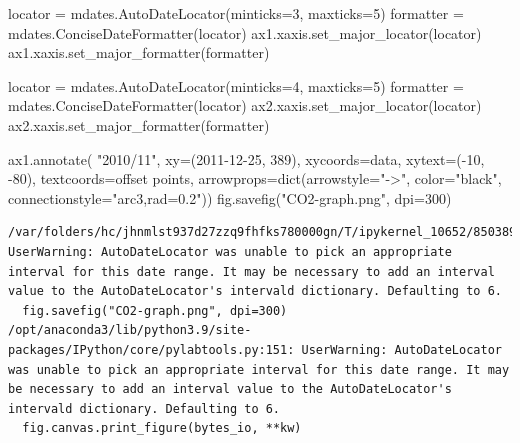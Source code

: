 \documentclass[
  letterpaper,
  DIV=11,
  numbers=noendperiod,
  oneside]{scrreprt}
\newenvironment{Shaded}{\begin{snugshade}}{\end{snugshade}}
\newcommand{\BuiltInTok}[1]{\textcolor[rgb]{0.00,0.23,0.31}{#1}}
\newcommand{\DecValTok}[1]{\textcolor[rgb]{0.68,0.00,0.00}{#1}}
\newcommand{\NormalTok}[1]{\textcolor[rgb]{0.00,0.23,0.31}{#1}}
\newcommand{\OperatorTok}[1]{\textcolor[rgb]{0.37,0.37,0.37}{#1}}
\newcommand{\StringTok}[1]{\textcolor[rgb]{0.13,0.47,0.30}{#1}}
\begin{document}
\begin{Shaded}
\begin{Highlighting}[]
\NormalTok{locator }\OperatorTok{=}\NormalTok{ mdates.AutoDateLocator(minticks}\OperatorTok{=}\DecValTok{3}\NormalTok{, maxticks}\OperatorTok{=}\DecValTok{5}\NormalTok{)}
\NormalTok{formatter }\OperatorTok{=}\NormalTok{ mdates.ConciseDateFormatter(locator)}
\NormalTok{ax1.xaxis.set\_major\_locator(locator)}
\NormalTok{ax1.xaxis.set\_major\_formatter(formatter)}

\NormalTok{locator }\OperatorTok{=}\NormalTok{ mdates.AutoDateLocator(minticks}\OperatorTok{=}\DecValTok{4}\NormalTok{, maxticks}\OperatorTok{=}\DecValTok{5}\NormalTok{)}
\NormalTok{formatter }\OperatorTok{=}\NormalTok{ mdates.ConciseDateFormatter(locator)}
\NormalTok{ax2.xaxis.set\_major\_locator(locator)}
\NormalTok{ax2.xaxis.set\_major\_formatter(formatter)}

\NormalTok{ax1.annotate(}
    \StringTok{"2010/11"}\NormalTok{,}
\NormalTok{    xy}\OperatorTok{=}\NormalTok{(}\StringTok{\textquotesingle{}2011{-}12{-}25\textquotesingle{}}\NormalTok{, }\DecValTok{389}\NormalTok{),  xycoords}\OperatorTok{=}\StringTok{\textquotesingle{}data\textquotesingle{}}\NormalTok{,}
\NormalTok{    xytext}\OperatorTok{=}\NormalTok{(}\OperatorTok{{-}}\DecValTok{10}\NormalTok{, }\OperatorTok{{-}}\DecValTok{80}\NormalTok{), textcoords}\OperatorTok{=}\StringTok{\textquotesingle{}offset points\textquotesingle{}}\NormalTok{,}
\NormalTok{    arrowprops}\OperatorTok{=}\BuiltInTok{dict}\NormalTok{(arrowstyle}\OperatorTok{=}\StringTok{"{-}\textgreater{}"}\NormalTok{,}
\NormalTok{                    color}\OperatorTok{=}\StringTok{"black"}\NormalTok{,}
\NormalTok{                    connectionstyle}\OperatorTok{=}\StringTok{"arc3,rad=0.2"}\NormalTok{))}
\NormalTok{fig.savefig(}\StringTok{"CO2{-}graph.png"}\NormalTok{, dpi}\OperatorTok{=}\DecValTok{300}\NormalTok{)}
\end{Highlighting}
\end{Shaded}

\begin{verbatim}
/var/folders/hc/jhnmlst937d27zzq9fhfks780000gn/T/ipykernel_10652/850389963.py:42: UserWarning: AutoDateLocator was unable to pick an appropriate interval for this date range. It may be necessary to add an interval value to the AutoDateLocator's intervald dictionary. Defaulting to 6.
  fig.savefig("CO2-graph.png", dpi=300)
/opt/anaconda3/lib/python3.9/site-packages/IPython/core/pylabtools.py:151: UserWarning: AutoDateLocator was unable to pick an appropriate interval for this date range. It may be necessary to add an interval value to the AutoDateLocator's intervald dictionary. Defaulting to 6.
  fig.canvas.print_figure(bytes_io, **kw)
\end{verbatim}
\end{document}
